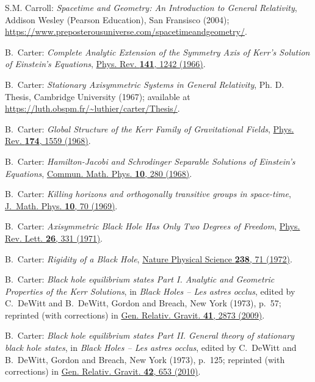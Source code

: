 \begin{thebibliography}{123}
S.M. Carroll: \emph{Spacetime and Geometry: An Introduction to General Relativity},
Addison Wesley (Pearson Education), San Fransisco (2004);
\url{https://www.preposterousuniverse.com/spacetimeandgeometry/}.

B.~Carter:
{\em Complete Analytic Extension of the Symmetry Axis of Kerr's Solution of Einstein's Equations},
\href{https://doi.org/10.1103/PhysRev.141.1242}{Phys. Rev. {\bf 141}, 1242 (1966)}.

B.~Carter: {\em Stationary Axisymmetric Systems in General Relativity},
Ph. D. Thesis, Cambridge University (1967); available at
\url{https://luth.obspm.fr/~luthier/carter/Thesis/}.

B.~Carter:
{\em Global Structure of the Kerr Family of Gravitational Fields},
\href{https://doi.org/10.1103/PhysRev.174.1559}{Phys. Rev. {\bf 174}, 1559 (1968)}.

B.~Carter:
{\em Hamilton-Jacobi and Schrodinger Separable Solutions of Einstein's Equations},
\href{https://doi.org/10.1007/BF03399503}{Commun. Math. Phys. {\bf 10}, 280 (1968)}.

B.~Carter:
{\em Killing horizons and orthogonally transitive groups in space-time},
\href{https://doi.org/10.1063/1.1664763}{J.~Math. Phys. {\bf 10}, 70 (1969)}.

B.~Carter:
{\em Axisymmetric Black Hole Has Only Two Degrees of Freedom},
\href{https://doi.org/10.1103/PhysRevLett.26.331}{Phys. Rev. Lett. {\bf 26}, 331 (1971)}.

B.~Carter:
{\em Rigidity of a Black Hole},
\href{https://doi.org/10.1038/physci238071b0}{Nature Physical Science {\bf 238}, 71 (1972)}.

B.~Carter:
{\em Black hole equilibrium states Part I.
Analytic and Geometric Properties of the Kerr Solutions},
in {\em Black Holes -- Les astres occlus},  edited by C.~DeWitt and B.~DeWitt,
Gordon and Breach, New York (1973), p.~57; reprinted (with corrections) in
\href{https://doi.org/10.1007/s10714-009-0888-5}{Gen. Relativ. Gravit. {\bf 41}, 2873 (2009)}.

B.~Carter:
{\em Black hole equilibrium states Part II. General theory of stationary black hole states}, in {\em Black Holes -- Les astres occlus}, edited by C.~DeWitt and B.~DeWitt,
Gordon and Breach, New York (1973), p.~125; reprinted (with corrections) in
\href{https://doi.org/10.1007/s10714-009-0920-9}{Gen. Relativ. Gravit. {\bf 42}, 653 (2010)}.


\end{thebibliography}
